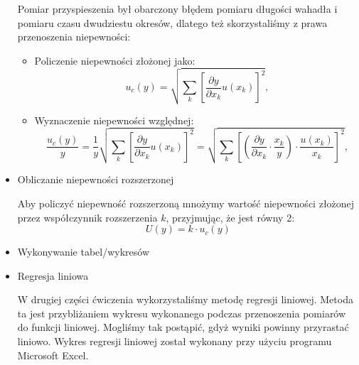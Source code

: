 \documentclass [a4paper,11pt]{article}
\begin{document}
\begin{itemize}
		Pomiar przyspieszenia był obarczony błędem pomiaru długości wahadła i pomiaru czasu dwudziestu okresów, dlatego też skorzystaliśmy z prawa przenoszenia niepewności:
		\begin{itemize}
			\item Policzenie niepewności złożonej jako:
			\begin{equation}
			\label{eq:wstepprzenoszenie1}
			u_c(y) = \sqrt{\sum_k \left[ \frac{\partial y}{\partial x_k}u(x_k) \right]^2}\text{,}
			\end{equation}
			\item Wyznaczenie niepewności względnej: 
			\begin{equation}
			\label{eq:wstepprzenoszenie2}
			\frac{u_c(y)}{y} = \frac{1}{y}\sqrt{\sum_k \left[ \frac{\partial y}{\partial x_k}u(x_k) \right]^2} = \sqrt{\sum_k \left[ \left( \frac{\partial y}{\partial x_k}\cdot \frac{x_k}{y} \right)\cdot \frac{u(x_k)}{x_k} \right]^2}\text{,}
			\end{equation}
		\end{itemize}
		
		\item Obliczanie niepewności rozszerzonej
		
		Aby policzyć niepewność rozszerzoną mnożymy wartość niepewności złożonej przez współczynnik rozszerzenia $k$, przyjmując, że jest równy 2:
		\begin{equation}
		\label{eq:wsteprozszerzona}
		U(y) = k \cdot u_c(y)
		\end{equation}
		
		\item Wykonywanie tabel/wykresów
		\item Regresja liniowa
		
		W drugiej części ćwiczenia wykorzystaliśmy metodę regresji liniowej. Metoda ta jest przybliżaniem wykresu wykonanego podczas przenoszenia pomiarów do funkcji liniowej. Mogliśmy tak postąpić, gdyż wyniki powinny przyrastać liniowo. Wykres regresji liniowej został wykonany przy użyciu programu Microsoft Excel. 
		
	\end{itemize}
	\newpage
\end{document}
